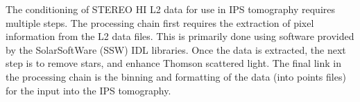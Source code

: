 The conditioning of STEREO HI L2 data for use in IPS tomography requires multiple steps. The processing chain first requires the extraction of pixel information from the L2 data files. This is primarily done using software provided by the SolarSoftWare (SSW) IDL libraries. Once the data is extracted, the next step is to remove stars, and enhance Thomson scattered light. The final link in the processing chain is the binning and formatting of the data (into points files) for the input into the IPS tomography.
